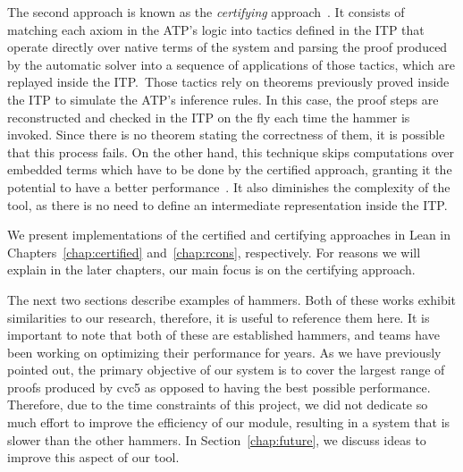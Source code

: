The second approach is known as the \textit{certifying} approach~\cite{snipe}. It consists of matching
each axiom in the ATP's logic into tactics
defined in the ITP that operate directly over native terms of the system and parsing
the proof produced by the automatic solver into a sequence of applications
of those tactics, which are replayed inside the ITP.\
Those tactics rely on theorems previously proved inside the ITP to simulate the ATP's inference rules.
In this case, the proof steps are reconstructed and checked in the ITP on the
fly each time the hammer is invoked. Since there is no theorem stating the
correctness of them, it is possible that this process fails.
On the other hand,
this technique skips computations over embedded terms which have to be done by the
certified approach, granting it the potential to have a better
performance~\cite{ringLean}. It also diminishes the complexity of the tool, as there is no need to
define an intermediate representation inside the ITP.\

We present implementations of the certified and certifying approaches in Lean
in Chapters~\ref{chap:certified} and~\ref{chap:rcons}, respectively. For reasons
we will explain in the later chapters, our main focus is on the certifying approach.

The next two sections describe examples of hammers.
Both of these works exhibit similarities to our research, therefore, it is useful to reference them here.
It is important to note that both of these are established hammers, and teams have been working on optimizing their
performance for years. As we have previously pointed out, the primary objective of our system is to cover the largest
range of proofs produced by cvc5 as opposed to having the best possible performance.
Therefore, due to the time constraints of this project, we did not dedicate so much effort to improve the
efficiency of our module, resulting in a system that is slower than the other hammers.
In Section~\ref{chap:future}, we discuss ideas to improve this aspect of our tool.

